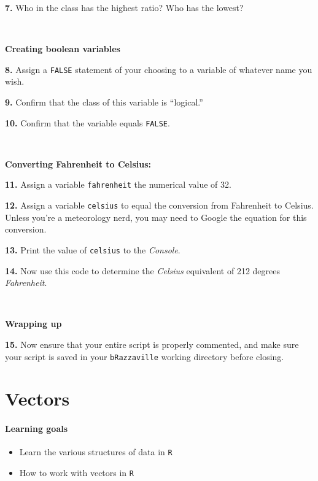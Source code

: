 \documentclass[
]{book}
\providecommand{\tightlist}{%
  \setlength{\itemsep}{0pt}\setlength{\parskip}{0pt}}
\begin{document}
\textbf{7.} Who in the class has the highest ratio? Who has the lowest?

~

\textbf{Creating boolean variables}

\textbf{8.} Assign a \texttt{FALSE} statement of your choosing to a variable of whatever name you wish.

\textbf{9.} Confirm that the class of this variable is ``logical.''

\textbf{10.} Confirm that the variable equals \texttt{FALSE}.

~

\textbf{Converting Fahrenheit to Celsius:}

\textbf{11.} Assign a variable \texttt{fahrenheit} the numerical value of 32.

\textbf{12.} Assign a variable \texttt{celsius} to equal the conversion from Fahrenheit to Celsius. Unless you're a meteorology nerd, you may need to Google the equation for this conversion.

\textbf{13.} Print the value of \texttt{celsius} to the \emph{Console}.

\textbf{14.} Now use this code to determine the \emph{Celsius} equivalent of 212 degrees \emph{Fahrenheit}.

~

\textbf{Wrapping up}

\textbf{15.} Now ensure that your entire script is properly commented, and make sure your script is saved in your \texttt{bRazzaville} working directory before closing.

\chapter{Vectors}\label{vectors}

\subsubsection*{Learning goals}\label{learning-goals-4}

\begin{itemize}
\tightlist
\item
  Learn the various structures of data in \texttt{R}\\
\item
  How to work with vectors in \texttt{R}
\end{itemize}

~
\end{document}
